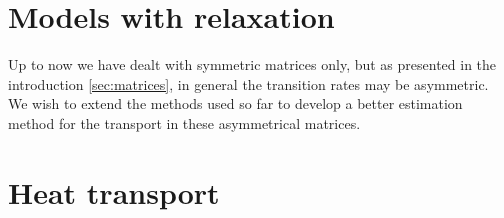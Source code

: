 
\section{Models with relaxation}




Up to now we have dealt with symmetric matrices only, but as presented in 
the introduction \autoref{sec:matrices}, in general the transition 
rates may be asymmetric. We wish to extend the methods used so far to
develop a better estimation method for the transport in these asymmetrical matrices.






\section{Heat transport}

\begin{comment}
Heat conduction by phonons is also affected by the localization properties
of the model. If disorder scatters normal modes and induces diffusive 
energy transport, followed by normal heat conduction, then in accordance to Fourier's law, 
the heat current $J$ depends inversely on the system size: $J\sim N^{-1}$. 
However, in recent studies \ref{who} it was shown that $J\sim N^{-\alpha}$ 
with $\alpha\ne 1$ is sometimes the case for disordered $1d$ harmonic chains.
We wish to investigate the validity of Fourier's law for quasi-$1d$ and 
higher dimensional disordered systems.
\end{comment}

